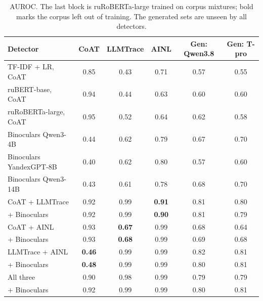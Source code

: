 \documentclass{article}
\begin{document}
\begin{table}[tbh!]
\begin{center}
\small
\begin{tabular}{|l|ccc|cc|}
\hline
Detector & CoAT & LLMTrace & AINL & Gen: Qwen3.8 & Gen: T-pro \\
\hline
TF-IDF + LR, CoAT & 0.85 & 0.43 & 0.71 & 0.57 & 0.55 \\
ruBERT-base, CoAT & 0.94 & 0.44 & 0.63 & 0.60 & 0.60 \\
ruRoBERTa-large, CoAT & 0.95 & 0.52 & 0.64 & 0.62 & 0.58 \\
\hline
Binoculars Qwen3-4B & 0.44 & 0.62 & 0.79 & 0.67 & 0.70 \\
Binoculars YandexGPT-8B & 0.40 & 0.62 & 0.80 & 0.57 & 0.60 \\
Binoculars Qwen3-14B & 0.43 & 0.61 & 0.78 & 0.68 & 0.70 \\
\hline
CoAT + LLMTrace & 0.92 & 0.99 & \textbf{0.91} & 0.81 & 0.80 \\
\quad + Binoculars & 0.92 & 0.99 & \textbf{0.90} & 0.81 & 0.79 \\
CoAT + AINL & 0.93 & \textbf{0.67} & 0.99 & 0.68 & 0.64 \\
\quad + Binoculars & 0.93 & \textbf{0.68} & 0.99 & 0.69 & 0.68 \\
LLMTrace + AINL & \textbf{0.46} & 0.99 & 0.99 & 0.82 & 0.81 \\
\quad + Binoculars & \textbf{0.48} & 0.99 & 0.99 & 0.80 & 0.81 \\
All three & 0.90 & 0.98 & 0.99 & 0.79 & 0.79 \\
\quad + Binoculars & 0.92 & 0.99 & 0.99 & 0.80 & 0.81 \\
\hline
\end{tabular}
\caption{AUROC. The last block is ruRoBERTa-large trained on corpus mixtures; bold marks the corpus left out of
training. The generated sets are unseen by all detectors.}
\label{tab:main}
\end{center}
\end{table}
\end{document}
